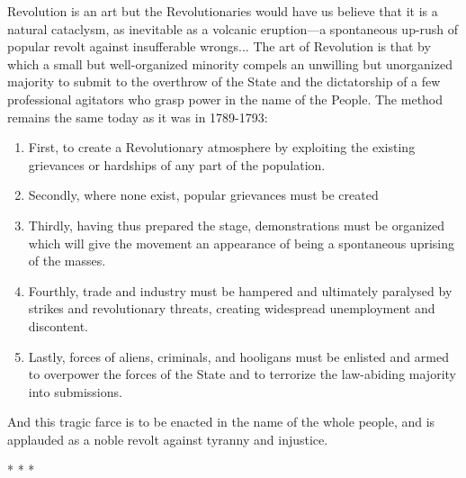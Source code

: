 \begin{quotex}
Revolution is an art but the Revolutionaries would have us believe that it is a natural cataclysm, as inevitable as a volcanic eruption---a spontaneous up-rush of popular revolt against insufferable wrongs... The art of Revolution is that by which a small but well-organized minority compels an unwilling but unorganized majority to submit to the overthrow of the State and the dictatorship of a few professional agitators who grasp power in the name of the People. The method remains the same today as it was in 1789-1793:

\begin{enumerate}


\item First, to create a Revolutionary atmosphere by exploiting the existing grievances or hardships of any part of the population.

\item Secondly, where none exist, popular grievances must be created

\item Thirdly, having thus prepared the stage, demonstrations must be organized which will give the movement an appearance of being a spontaneous uprising of the masses.

\item Fourthly, trade and industry must be hampered and ultimately paralysed by strikes and revolutionary threats, creating widespread unemployment and discontent.

\item Lastly, forces of aliens, criminals, and hooligans must be enlisted and armed to overpower the forces of the State and to terrorize the law-abiding majority into submissions.
\end{enumerate}

And this tragic farce is to be enacted in the name of the whole people, and is applauded as a noble revolt against tyranny and injustice.
\end{quotex}




\begin{center}* * *\end{center}

